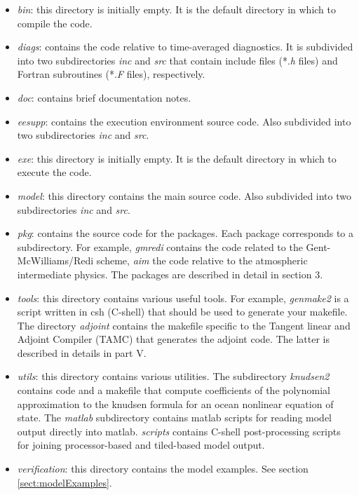 \begin{itemize}

\item \textit{bin}: this directory is initially empty. It is the
  default directory in which to compile the code.
  
\item \textit{diags}: contains the code relative to time-averaged
  diagnostics. It is subdivided into two subdirectories \textit{inc}
  and \textit{src} that contain include files (*.\textit{h} files) and
  Fortran subroutines (*.\textit{F} files), respectively.

\item \textit{doc}: contains brief documentation notes.
  
\item \textit{eesupp}: contains the execution environment source code.
  Also subdivided into two subdirectories \textit{inc} and
  \textit{src}.
  
\item \textit{exe}: this directory is initially empty. It is the
  default directory in which to execute the code.
  
\item \textit{model}: this directory contains the main source code.
  Also subdivided into two subdirectories \textit{inc} and
  \textit{src}.
  
\item \textit{pkg}: contains the source code for the packages. Each
  package corresponds to a subdirectory. For example, \textit{gmredi}
  contains the code related to the Gent-McWilliams/Redi scheme,
  \textit{aim} the code relative to the atmospheric intermediate
  physics. The packages are described in detail in section 3.
  
\item \textit{tools}: this directory contains various useful tools.
  For example, \textit{genmake2} is a script written in csh (C-shell)
  that should be used to generate your makefile. The directory
  \textit{adjoint} contains the makefile specific to the Tangent
  linear and Adjoint Compiler (TAMC) that generates the adjoint code.
  The latter is described in details in part V.
  
\item \textit{utils}: this directory contains various utilities. The
  subdirectory \textit{knudsen2} contains code and a makefile that
  compute coefficients of the polynomial approximation to the knudsen
  formula for an ocean nonlinear equation of state. The
  \textit{matlab} subdirectory contains matlab scripts for reading
  model output directly into matlab. \textit{scripts} contains C-shell
  post-processing scripts for joining processor-based and tiled-based
  model output.
  
\item \textit{verification}: this directory contains the model
  examples. See section \ref{sect:modelExamples}.

\end{itemize}

